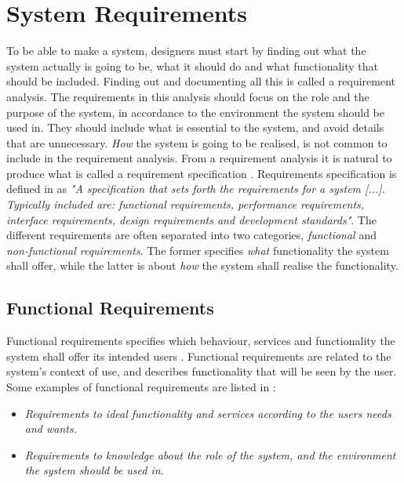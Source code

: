 \section{System Requirements}
\label{sec:systemreq}
To be able to make a system, designers must start by finding out what the system actually is going to be, what it should do and what functionality that should be included. Finding out and documenting all this is called a requirement analysis. The requirements in this analysis should focus on the role and the purpose of the system, in accordance to the environment the system should be used in. They should include what is essential to the system, and avoid details that are unnecessary. \emph{How} the system is going to be realised, is not common to include in the requirement analysis. From a requirement analysis it is natural to produce what is called a requirement specification \cite{braude2000software}. Requirements specification is defined in \cite{systemutviklingDel1} as \emph{"A specification that sets forth the requirements for a system [...]. Typically included are: functional requirements, performance requirements, interface requirements, design requirements and development standards"}. The different requirements are often separated into two categories, \emph{functional} and \emph{non-functional requirements}. The former specifies \emph{what} functionality the system shall offer, while the latter is about \emph{how} the system shall realise the functionality. 

\subsection{Functional Requirements}
Functional requirements specifies which behaviour, services and functionality the system shall offer its intended users \cite{systemutviklingDel1} \cite{mmi}. Functional requirements are related to the system's context of use, and describes functionality that will be seen by the user. Some examples of functional requirements are listed in \cite{systemutviklingDel1}:
\begin{itemize}
\item \emph{Requirements to ideal functionality and services according to the users needs and wants.}
\item \emph{Requirements to knowledge about the role of the system, and the environment the system should be used in.}
\end{itemize}     

